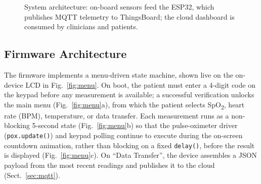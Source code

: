 \documentclass[pdflatex,sn-mathphys-num]{sn-jnl}
\begin{document}
\begin{figure}[!htbp]
\centering
{}
\caption{System architecture: on-board sensors feed the ESP32, which
publishes MQTT telemetry to ThingsBoard; the cloud dashboard is
consumed by clinicians and patients.}\label{fig:arch}
\end{figure}

\subsection{Firmware Architecture}

The firmware implements a menu-driven state machine, shown live on
the on-device LCD in Fig.~\ref{fig:menu}. On boot, the patient must
enter a 4-digit code on the keypad before any measurement is
available; a successful verification unlocks the main menu
(Fig.~\ref{fig:menu}a), from which the patient selects
SpO\textsubscript{2}, heart rate (BPM), temperature, or data transfer.
Each measurement runs as a non-blocking 5-second state
(Fig.~\ref{fig:menu}b) so that the pulse-oximeter driver
(\texttt{pox.update()}) and keypad polling continue to execute during
the on-screen countdown animation, rather than blocking on a fixed
\texttt{delay()}, before the result is displayed
(Fig.~\ref{fig:menu}c). On ``Data Transfer'', the device assembles a
JSON payload from the most recent readings and publishes it to the
cloud (Sect.~\ref{sec:mqtt}).
\end{document}
